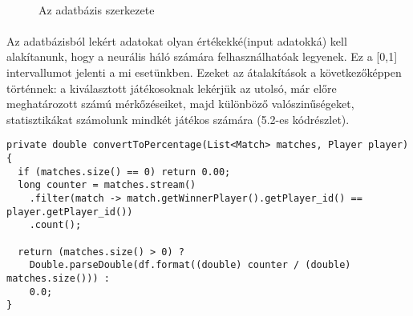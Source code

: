 \paragraph{}
\begin{figure}[t]
  \centering
  \caption[Az adatbázis]%
  { Az adatbázis szerkezete }
  \label{fig:ALAP:sm1}
\end{figure}
\paragraph{}
Az adatbázisból lekért adatokat olyan értékekké(input adatokká) kell alakítanunk, hogy a neurális háló számára felhasználhatóak legyenek. Ez a [0,1] intervallumot jelenti a mi esetünkben. Ezeket az átalakítások a következőképpen történnek: a kiválasztott játékosoknak lekérjük az utolsó, már előre meghatározott számú mérkőzéseiket, majd különböző valószinűségeket, statisztikákat számolunk mindkét játékos számára (5.2-es kódrészlet).

\begin{lstlisting}[caption= Egy játékos utolsó mérkőzéseinek győzelmi rátája]
private double convertToPercentage(List<Match> matches, Player player){
  if (matches.size() == 0) return 0.00;
  long counter = matches.stream()
    .filter(match -> match.getWinnerPlayer().getPlayer_id() == player.getPlayer_id())
    .count();

  return (matches.size() > 0) ? 
    Double.parseDouble(df.format((double) counter / (double) matches.size())) : 
    0.0;
}
\end{lstlisting}

